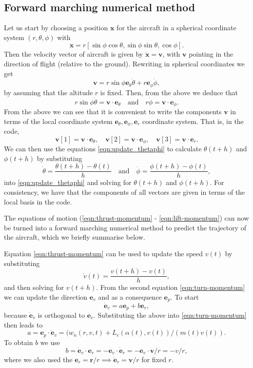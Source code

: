 \documentclass{article}
\renewcommand{\vec}[1]{\boldsymbol{#1}}
\begin{document}
\subsection{Forward marching numerical method}

Let us start by choosing a position $\vec x$ for the aircraft in a spherical coordinate system $(r,\theta,\phi)$ with
\[
\vec x = r [ \sin \phi \cos \theta, \sin \phi \sin \theta,   \cos \phi].
\]
Then the velocity vector of aircraft is given by $\dot{\vec x} = \vec v$, with $\vec v$ pointing in the direction of flight (relative to the ground). Rewriting in spherical coordinates we get
\[
\vec v = r \sin \phi  {\vec e_\theta} \dot \theta + r  {\vec e_\phi} \dot \phi, 
\]
by assuming that the altitude $r$ is fixed. Then, from the above we deduce that
\begin{equation} \label{eqn:update_thetaphi}
    r \sin \phi \dot \theta = \vec v \cdot {\vec e}_\theta  \quad \text{and} \quad 
r \dot \phi = \vec v \cdot {\vec e}_\phi.
\end{equation}
From the above we can see that it is convenient to write the components $\vec v$ in terms of the local coordinate system ${\vec e}_\theta, {\vec e}_\phi, {\vec e}_r$ coordinate system. That is, in the code, 
\[
\vec v[1] = \vec v \cdot {\vec e}_\theta, \quad 
\vec v[2] = \vec v \cdot {\vec e}_\phi, 
\quad 
\vec v[3] = \vec v \cdot {\vec e}_r.
\]
We can then use the equations \eqref{eqn:update_thetaphi}  to calculate $\theta(t+h)$ and $\phi(t+h)$ by substituting 
\[
\dot \theta = \frac{ \theta(t+h) - \theta(t)}{h} \quad \text{and} \quad 
\dot \phi = \frac{ \phi(t+h) - \phi(t)}{h},
\]
into \eqref{eqn:update_thetaphi} and solving for $\theta(t+h)$ and $\phi(t+h)$. For consistency, we have that the components of all vectors are given in terms of the local basis in the code.

The equations of motion (\ref{eqn:thrust-momentum} - \ref{eqn:lift-momentum}) can now be turned into a forward marching numerical method to predict the trajectory of the aircraft, which we briefly summarise below.

Equation \eqref{eqn:thrust-momentum} can be used to update the speed $v(t)$ by substituting
\[
\dot { v}(t) = \frac{{v}(t+h) - {v}(t)}{h},
\]
and then solving for ${v}(t+h)$. From the second equation \eqref{eqn:turn-momentum} we can update the direction $\vec {e}_v$ and as a consequence $\vec e_p$. To start
\[
\dot{\vec e}_v = a {\vec e}_p + b {\vec e}_r, 
\]
because $\dot {\vec e}_v$ is orthogonal to ${\vec e}_v$. Substituting the above into \eqref{eqn:turn-momentum} then leads to
\begin{equation}
 a =  {\vec{e}}_p \cdot \dot{\vec{e}}_v =  (w_n(r,v,t) + L_c(\alpha(t),v(t) ) / (m(t) v(t)).
\end{equation}
To obtain $b$ we use 
\begin{equation}
b = \dot{\vec e}_v \cdot  {\vec e}_r = - {\vec e}_v \cdot  \dot {\vec e}_r =  - {\vec e}_v \cdot  {\vec v} / r = - v / r,    
\end{equation}
where we also used the $\vec e_r = \vec r / r \implies \dot{\vec e}_r = \vec v / r$ for fixed $r$.
\end{document}
